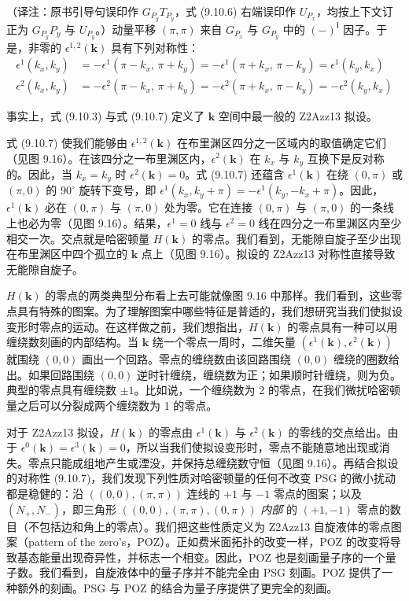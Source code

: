 （译注：原书引导句误印作 $G_{P_{y}}T_{P_{y}}$，式 (9.10.6) 右端误印作 $U_{P_{x}}$，均按上下文订正为 $G_{P_{y}}P_{y}$ 与 $U_{P_{y}}$。）动量平移 $(\pi,\pi)$ 来自 $G_{P_{x}}$ 与 $G_{P_{y}}$ 中的 $(-)^{\pmb{i}}$ 因子。于是，非零的 $\epsilon^{1,2}(\pmb{k})$ 具有下列对称性：
\begin{align*}
\epsilon^{1}(k_{x},k_{y})&=-\epsilon^{1}(\pi-k_{x},\,\pi+k_{y})=-\epsilon^{1}(\pi+k_{x},\,\pi-k_{y})=\epsilon^{1}(k_{y},k_{x})\\
\epsilon^{2}(k_{x},k_{y})&=-\epsilon^{2}(\pi-k_{x},\,\pi+k_{y})=-\epsilon^{2}(\pi+k_{x},\,\pi-k_{y})=-\epsilon^{2}(k_{y},k_{x})\tag{9.10.7}
\end{align*}

事实上，式 (9.10.3) 与式 (9.10.7) 定义了 $\pmb{k}$ 空间中最一般的 Z2Azz13 拟设。

式 (9.10.7) 使我们能够由 $\epsilon^{1,2}(\pmb{k})$ 在布里渊区四分之一区域内的取值确定它们（见图 9.16）。在该四分之一布里渊区内，$\epsilon^{2}(\pmb{k})$ 在 $k_{x}$ 与 $k_{y}$ 互换下是反对称的。因此，当 $k_{x}=k_{y}$ 时 $\epsilon^{2}(\pmb{k})=0$。式 (9.10.7) 还蕴含 $\epsilon^{1}(\pmb{k})$ 在绕 $(0,\pi)$ 或 $(\pi,0)$ 的 $90^{\circ}$ 旋转下变号，即 $\epsilon^{1}(k_{x},k_{y}+\pi)=-\epsilon^{1}(k_{y},-k_{x}+\pi)$。因此，$\epsilon^{1}(\pmb{k})$ 必在 $(0,\pi)$ 与 $(\pi,0)$ 处为零。它在连接 $(0,\pi)$ 与 $(\pi,0)$ 的一条线上也必为零（见图 9.16）。结果，$\epsilon^{1}=0$ 线与 $\epsilon^{2}=0$ 线在四分之一布里渊区内至少相交一次。交点就是哈密顿量 $H(\pmb{k})$ 的零点。我们看到，无能隙自旋子至少出现在布里渊区中四个孤立的 $\pmb{k}$ 点上（见图 9.16）。拟设的 Z2Azz13 对称性直接导致无能隙自旋子。

$H(\pmb{k})$ 的零点的两类典型分布看上去可能就像图 9.16 中那样。我们看到，这些零点具有特殊的图案。为了理解图案中哪些特征是普适的，我们想研究当我们使拟设变形时零点的运动。在这样做之前，我们想指出，$H(\pmb{k})$ 的零点具有一种可以用缠绕数刻画的内部结构。当 $\pmb{k}$ 绕一个零点一周时，二维矢量 $(\epsilon^{1}(\pmb{k}),\epsilon^{2}(\pmb{k}))$ 就围绕 $(0,0)$ 画出一个回路。零点的缠绕数由该回路围绕 $(0,0)$ 缠绕的圈数给出。如果回路围绕 $(0,0)$ 逆时针缠绕，缠绕数为正；如果顺时针缠绕，则为负。典型的零点具有缠绕数 $\pm1$。比如说，一个缠绕数为 2 的零点，在我们微扰哈密顿量之后可以分裂成两个缠绕数为 1 的零点。

对于 Z2Azz13 拟设，$H(\pmb{k})$ 的零点由 $\epsilon^{1}(\pmb{k})$ 与 $\epsilon^{2}(\pmb{k})$ 的零线的交点给出。由于 $\epsilon^{0}(\pmb{k})=\epsilon^{3}(\pmb{k})=0$，所以当我们使拟设变形时，零点不能随意地出现或消失。零点只能成组地产生或湮没，并保持总缠绕数守恒（见图 9.16）。再结合拟设的对称性 (9.10.7)，我们发现下列性质对哈密顿量的任何不改变 PSG 的微小扰动都是稳健的：沿 $((0,0),(\pi,\pi))$ 连线的 $+1$ 与 $-1$ 零点的图案；以及 $(N_{+},N_{-})$，即三角形 $((0,0),(\pi,\pi),(0,\pi))$ \emph{内部} 的 $(+1,-1)$ 零点的数目（不包括边和角上的零点）。我们把这些性质定义为 Z2Azz13 自旋液体的零点图案（pattern of the zero's，POZ）。正如费米面拓扑的改变一样，POZ 的改变将导致基态能量出现奇异性，并标志一个相变。因此，POZ 也是刻画量子序的一个量子数。我们看到，自旋液体中的量子序并不能完全由 PSG 刻画。POZ 提供了一种额外的刻画。PSG 与 POZ 的结合为量子序提供了更完全的刻画。

